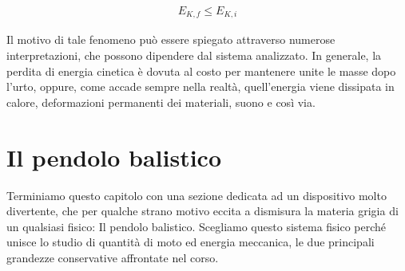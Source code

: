 \begin{align}
    E_{K,f} \leq E_{K,i}
\end{align}

\noindent Il motivo di tale fenomeno può essere spiegato attraverso numerose
interpretazioni, che possono dipendere dal sistema analizzato. In generale,
la perdita di energia cinetica è dovuta al costo per mantenere unite le
masse dopo l'urto, oppure, come accade sempre nella realtà, quell'energia
viene dissipata in calore, deformazioni permanenti dei materiali, suono e
così via.

\section{Il pendolo balistico}
Terminiamo questo capitolo con una sezione dedicata ad un dispositivo
molto divertente, che per qualche strano motivo eccita a dismisura la
materia grigia di un qualsiasi fisico: Il pendolo balistico. Scegliamo
questo sistema fisico perché unisce lo studio di quantità di moto ed
energia meccanica, le due principali grandezze conservative affrontate
nel corso.